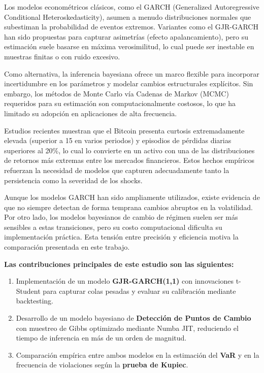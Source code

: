 \documentclass[
]{ceurart}
\begin{document}
Los modelos econométricos clásicos, como el GARCH (Generalized Autoregressive Conditional Heteroskedasticity), asumen a menudo distribuciones normales que subestiman la probabilidad de eventos extremos. Variantes como el GJR-GARCH han sido propuestas para capturar asimetrías (efecto apalancamiento), pero su estimación suele basarse en máxima verosimilitud, lo cual puede ser inestable en muestras finitas o con ruido excesivo.

Como alternativa, la inferencia bayesiana ofrece un marco flexible para incorporar incertidumbre en los parámetros y modelar cambios estructurales explícitos. Sin embargo, los métodos de Monte Carlo vía Cadenas de Markov (MCMC) requeridos para su estimación son computacionalmente costosos, lo que ha limitado su adopción en aplicaciones de alta frecuencia.

Estudios recientes muestran que el Bitcoin presenta curtosis extremadamente elevada (superior a 15 en varios periodos) y episodios de pérdidas diarias superiores al 20\%, lo cual lo convierte en un activo con una de las distribuciones de retornos más extremas entre los mercados financieros. Estos hechos empíricos refuerzan la necesidad de modelos que capturen adecuadamente tanto la persistencia como la severidad de los shocks.

Aunque los modelos GARCH han sido ampliamente utilizados, existe evidencia de que no siempre detectan de forma temprana cambios abruptos en la volatilidad. Por otro lado, los modelos bayesianos de cambio de régimen suelen ser más sensibles a estas transiciones, pero su costo computacional dificulta su implementación práctica. Esta tensión entre precisión y eficiencia motiva la comparación presentada en este trabajo.

\textbf{Las contribuciones principales de este estudio son las siguientes:}
\begin{enumerate}
    \item Implementación de un modelo \textbf{GJR-GARCH(1,1)} con innovaciones t-Student para capturar colas pesadas y evaluar su calibración mediante backtesting.
    \item Desarrollo de un modelo bayesiano de \textbf{Detección de Puntos de Cambio} con muestreo de Gibbs optimizado mediante Numba JIT, reduciendo el tiempo de inferencia en más de un orden de magnitud.
    \item Comparación empírica entre ambos modelos en la estimación del \textbf{VaR} y en la frecuencia de violaciones según la \textbf{prueba de Kupiec}.
\end{enumerate}
\end{document}
